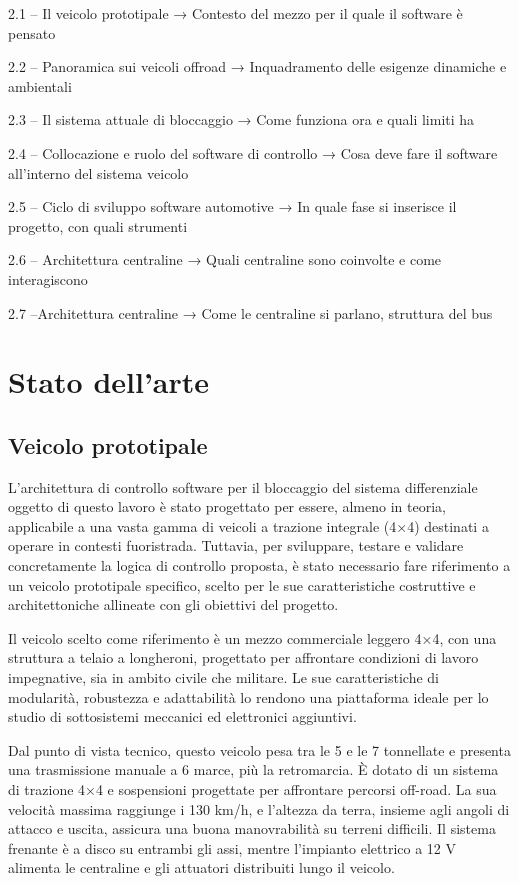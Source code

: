 \documentclass[11pt]{report}
\begin{document}
	
	2.1 – Il veicolo prototipale
	→ Contesto del mezzo per il quale il software è pensato
	
	2.2 – Panoramica sui veicoli offroad
	→ Inquadramento delle esigenze dinamiche e ambientali
	
	2.3 – Il sistema attuale di bloccaggio
	→ Come funziona ora e quali limiti ha
	
	2.4 – Collocazione e ruolo del software di controllo
	→ Cosa deve fare il software all’interno del sistema veicolo
	
	2.5 – Ciclo di sviluppo software automotive
	→ In quale fase si inserisce il progetto, con quali strumenti
	
	2.6 – Architettura centraline
	→ Quali centraline sono coinvolte e come interagiscono
	
	2.7 –Architettura centraline
	→ Come le centraline si parlano, struttura del bus
	
	\chapter{Stato dell'arte}
	
	\section{Veicolo prototipale}

	L'architettura di controllo software per il bloccaggio del sistema differenziale oggetto di questo lavoro è stato progettato per essere, almeno in teoria, applicabile a una vasta gamma di veicoli a trazione integrale (4×4) destinati a operare in contesti fuoristrada. Tuttavia, per sviluppare, testare e validare concretamente la logica di controllo proposta, è stato necessario fare riferimento a un veicolo prototipale specifico, scelto per le sue caratteristiche costruttive e architettoniche allineate con gli obiettivi del progetto.
	
	Il veicolo scelto come riferimento è un mezzo commerciale leggero 4×4, con una struttura a telaio a longheroni, progettato per affrontare condizioni di lavoro impegnative, sia in ambito civile che militare. Le sue caratteristiche di modularità, robustezza e adattabilità lo rendono una piattaforma ideale per lo studio di  sottosistemi meccanici ed elettronici aggiuntivi.
	
	Dal punto di vista tecnico, questo veicolo pesa tra le 5 e le 7 tonnellate e presenta una trasmissione manuale a 6 marce, più la retromarcia. È dotato di un sistema di trazione 4×4 e sospensioni progettate per affrontare percorsi off-road. La sua velocità massima raggiunge i 130 km/h, e l'altezza da terra, insieme agli angoli di attacco e uscita, assicura una buona manovrabilità su terreni difficili. Il sistema frenante è a disco su entrambi gli assi, mentre l'impianto elettrico a 12 V alimenta le centraline e gli attuatori distribuiti lungo il veicolo.
	
\end{document}
